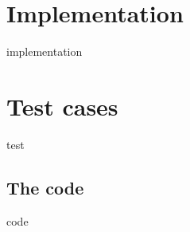 \section{Implementation}
{implementation}

\section{Test cases}
{test}

\clearpage
\printbibliography[heading=bibintoc]

\clearpage
\begin{appendices}

\section{The code} \label{appendix:code}
{code}

\end{appendices}

